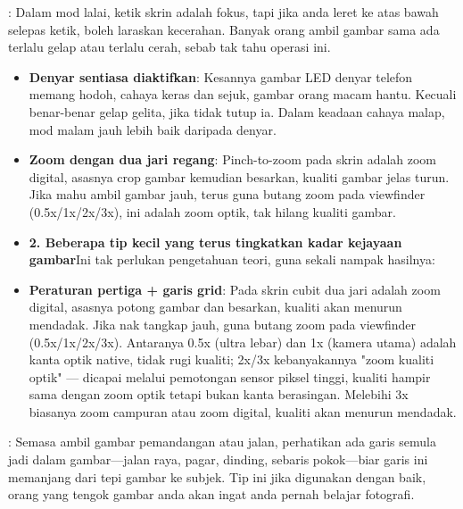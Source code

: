 


: Dalam mod lalai, ketik skrin adalah fokus, tapi jika anda leret ke atas bawah selepas ketik, boleh laraskan kecerahan. Banyak orang ambil gambar sama ada terlalu gelap atau terlalu cerah, sebab tak tahu operasi ini.

\begin{itemize}
  \item \textbf{Denyar sentiasa diaktifkan}: Kesannya gambar LED denyar telefon memang hodoh, cahaya keras dan sejuk, gambar orang macam hantu. Kecuali benar-benar gelap gelita, jika tidak tutup ia. Dalam keadaan cahaya malap, mod malam jauh lebih baik daripada denyar.
  \item \textbf{Zoom dengan dua jari regang}: Pinch-to-zoom pada skrin adalah zoom digital, asasnya crop gambar kemudian besarkan, kualiti gambar jelas turun. Jika mahu ambil gambar jauh, terus guna butang zoom pada viewfinder (0.5x/1x/2x/3x), ini adalah zoom optik, tak hilang kualiti gambar.
  \item \textbf{2. Beberapa tip kecil yang terus tingkatkan kadar kejayaan gambar}Ini tak perlukan pengetahuan teori, guna sekali nampak hasilnya:
  \item \textbf{Peraturan pertiga + garis grid}: Pada skrin cubit dua jari adalah zoom digital, asasnya potong gambar dan besarkan, kualiti akan menurun mendadak. Jika nak tangkap jauh, guna butang zoom pada viewfinder (0.5x/1x/2x/3x). Antaranya 0.5x (ultra lebar) dan 1x (kamera utama) adalah kanta optik native, tidak rugi kualiti; 2x/3x kebanyakannya "zoom kualiti optik" — dicapai melalui pemotongan sensor piksel tinggi, kualiti hampir sama dengan zoom optik tetapi bukan kanta berasingan. Melebihi 3x biasanya zoom campuran atau zoom digital, kualiti akan menurun mendadak.
\end{itemize}


: Semasa ambil gambar pemandangan atau jalan, perhatikan ada garis semula jadi dalam gambar—jalan raya, pagar, dinding, sebaris pokok—biar garis ini memanjang dari tepi gambar ke subjek. Tip ini jika digunakan dengan baik, orang yang tengok gambar anda akan ingat anda pernah belajar fotografi.


